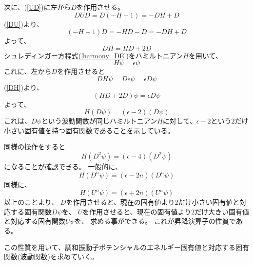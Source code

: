 次に、(\ref{UD})に左から$D$を作用させる。
\begin{equation}
  DUD = D(-H+1) = -DH + D
\end{equation}
(\ref{DU})より、
\begin{equation}
  (-H-1)D = -HD-D = -DH + D
\end{equation}
よって、
\begin{equation}
  \label{DH}
  DH = HD + 2D
\end{equation}
シュレディンガー方程式(\ref{harmony_DE})をハミルトニアン$H$を用いて、
\begin{equation}
  \label{Hpsi}
  H\psi = \epsilon\psi
\end{equation}
これに、左から$D$を作用させると
\begin{equation}
  DH\psi = D\epsilon\psi
  = \epsilon D \psi
\end{equation}
(\ref{DH})より、
\begin{equation}
  (HD + 2D)\psi = \epsilon D \psi
\end{equation}
よって、
\begin{equation}
  H(D\psi) = (\epsilon-2)(D\psi)
\end{equation}
これは、$D\psi$という波動関数が同じハミルトニアン$H$に対して、$\epsilon-2$という$2$だけ小さい固有値を持つ固有関数であることを示している。

同様の操作をすると
\begin{equation}
  H(D^2\psi) = (\epsilon-4)(D^2\psi)
\end{equation}
になることが確認できる。
一般的に、
\begin{equation}
  H(D^n\psi) = (\epsilon-2n)(D^n\psi)
\end{equation}
同様に、
\begin{equation}
  H(U^n\psi) = (\epsilon+2n)(U^n\psi)
\end{equation}
以上のことより、
$D$を作用させると、現在の固有値より$2$だけ小さい固有値と対応する固有関数$D\psi$を、
$U$を作用させると、現在の固有値より$2$だけ大きい固有値と対応する固有関数$U\psi$を、
求める事ができる。
これが昇降演算子の性質である。

この性質を用いて、調和振動子ポテンシャルのエネルギー固有値と対応する固有関数(波動関数)を求めていく。

